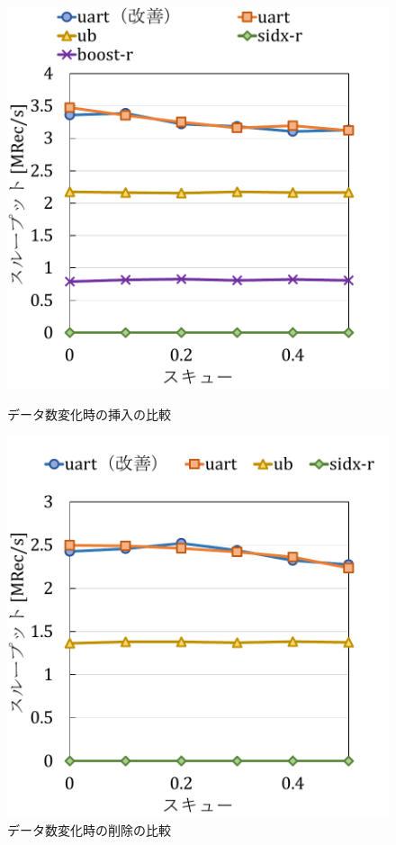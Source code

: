 \begin{figure}[tb]
  \begin{minipage}[c]{0.495\textwidth}
    \centering
    \includegraphics[scale=0.5]{./figures/graph-skew-delete-2.pdf}
    \caption{データ数変化時の挿入の比較}
    \label{graph:grouped}
  \end{minipage}
  \begin{minipage}[c]{0.495\textwidth}
    \centering
    \includegraphics[scale=0.5]{./figures/graph-skew-delete-8.pdf}
    \caption{データ数変化時の削除の比較}
    \label{graph:paired}
  \end{minipage}
\end{figure}


